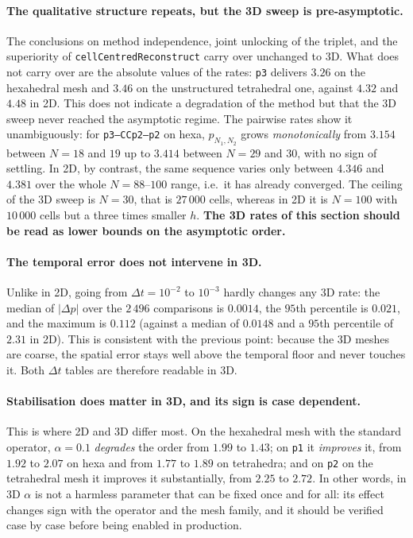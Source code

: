 \documentclass[11pt,a4paper]{article}
\newcommand{\code}[1]{\texttt{\small #1}}
\begin{document}
\paragraph{The qualitative structure repeats, but the 3D sweep is
pre-asymptotic.}
The conclusions on method independence, joint unlocking of the triplet, and the
superiority of \code{cellCentredReconstruct} carry over unchanged to 3D. What
does not carry over are the absolute values of the rates: \code{p3} delivers
$3.26$ on the hexahedral mesh and $3.46$ on the unstructured tetrahedral one,
against $4.32$ and $4.48$ in 2D. This does not indicate a degradation of the
method but that the 3D sweep never reached the asymptotic regime. The pairwise
rates show it unambiguously: for \code{p3--CCp2--p2} on hexa, $p_{N_1,N_2}$
grows \emph{monotonically} from $3.154$ between $N=18$ and $19$ up to $3.414$
between $N=29$ and $30$, with no sign of settling. In 2D, by contrast, the same
sequence varies only between $4.346$ and $4.381$ over the whole $N=88$--$100$
range, i.e.\ it has already converged. The ceiling of the 3D sweep is $N=30$,
that is $27\,000$ cells, whereas in 2D it is $N=100$ with $10\,000$ cells but a
three times smaller $h$. \textbf{The 3D rates of this section should be read as
lower bounds on the asymptotic order.}

\paragraph{The temporal error does not intervene in 3D.}
Unlike in 2D, going from $\Delta t=10^{-2}$ to $10^{-3}$ hardly changes any 3D
rate: the median of $|\Delta p|$ over the $2\,496$ comparisons is $0.0014$, the
$95$th percentile is $0.021$, and the maximum is $0.112$ (against a median of
$0.0148$ and a $95$th percentile of $2.31$ in 2D). This is consistent with the
previous point: because the 3D meshes are coarse, the spatial error stays well
above the temporal floor and never touches it. Both $\Delta t$ tables are
therefore readable in 3D.

\paragraph{Stabilisation does matter in 3D, and its sign is case dependent.}
This is where 2D and 3D differ most. On the hexahedral mesh with the standard
operator, $\alpha=0.1$ \emph{degrades} the order from $1.99$ to $1.43$; on
\code{p1} it \emph{improves} it, from $1.92$ to $2.07$ on hexa and from $1.77$
to $1.89$ on tetrahedra; and on \code{p2} on the tetrahedral mesh it improves it
substantially, from $2.25$ to $2.72$. In other words, in 3D $\alpha$ is not a
harmless parameter that can be fixed once and for all: its effect changes sign
with the operator and the mesh family, and it should be verified case by case
before being enabled in production.
\end{document}
